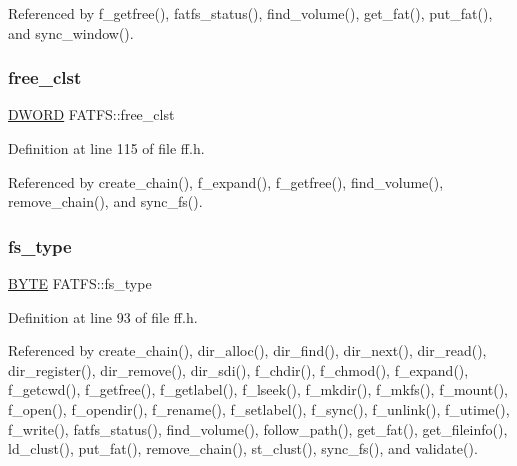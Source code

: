 Referenced by f\+\_\+getfree(), fatfs\+\_\+status(), find\+\_\+volume(), get\+\_\+fat(), put\+\_\+fat(), and sync\+\_\+window().

\mbox{\label{structFATFS_ac834248773bf338df807f0d7e6b6a579}} 
\subsubsection{\texorpdfstring{free\+\_\+clst}{free\_clst}}
{\footnotesize\ttfamily \hyperlink{integer_8h_ad342ac907eb044443153a22f964bf0af}{D\+W\+O\+RD} F\+A\+T\+F\+S\+::free\+\_\+clst}



Definition at line 115 of file ff.\+h.



Referenced by create\+\_\+chain(), f\+\_\+expand(), f\+\_\+getfree(), find\+\_\+volume(), remove\+\_\+chain(), and sync\+\_\+fs().

\mbox{\label{structFATFS_add27d97babe807b573eac98a71dc4ae5}} 
\subsubsection{\texorpdfstring{fs\+\_\+type}{fs\_type}}
{\footnotesize\ttfamily \hyperlink{integer_8h_a4ae1dab0fb4b072a66584546209e7d58}{B\+Y\+TE} F\+A\+T\+F\+S\+::fs\+\_\+type}



Definition at line 93 of file ff.\+h.



Referenced by create\+\_\+chain(), dir\+\_\+alloc(), dir\+\_\+find(), dir\+\_\+next(), dir\+\_\+read(), dir\+\_\+register(), dir\+\_\+remove(), dir\+\_\+sdi(), f\+\_\+chdir(), f\+\_\+chmod(), f\+\_\+expand(), f\+\_\+getcwd(), f\+\_\+getfree(), f\+\_\+getlabel(), f\+\_\+lseek(), f\+\_\+mkdir(), f\+\_\+mkfs(), f\+\_\+mount(), f\+\_\+open(), f\+\_\+opendir(), f\+\_\+rename(), f\+\_\+setlabel(), f\+\_\+sync(), f\+\_\+unlink(), f\+\_\+utime(), f\+\_\+write(), fatfs\+\_\+status(), find\+\_\+volume(), follow\+\_\+path(), get\+\_\+fat(), get\+\_\+fileinfo(), ld\+\_\+clust(), put\+\_\+fat(), remove\+\_\+chain(), st\+\_\+clust(), sync\+\_\+fs(), and validate().

